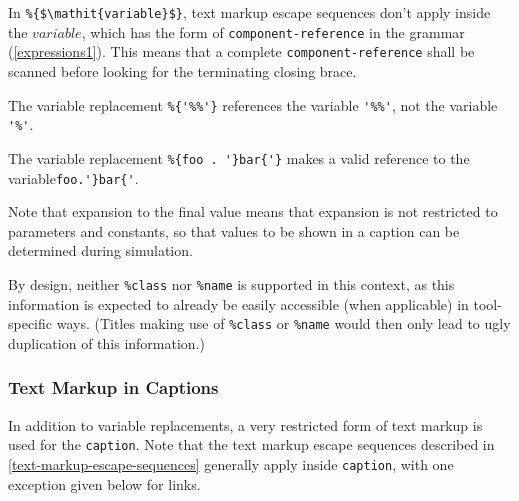 In \lstinline!%{$\mathit{variable}$}!, text markup escape sequences don't apply inside the $\mathit{variable}$, which has the form of \lstinline[language=grammar]!component-reference! in the grammar (\cref{expressions1}).  This means that a complete \lstinline[language=grammar]!component-reference! shall be scanned before looking for the terminating closing brace.

\begin{example}
The variable replacement \lstinline!%{'%%'}! references the variable \lstinline!'%%'!, not the variable \lstinline!'%'!.
\end{example}

\begin{example}
The variable replacement \lstinline!%{foo . '}bar{'}! makes a valid reference to the variable\linebreak[4] \lstinline!foo.'}bar{'!.
\end{example}

Note that expansion to the final value means that expansion is not restricted to
parameters and constants, so that values to be shown in a caption can be
determined during simulation.

\begin{nonnormative}
By design, neither \lstinline!%class! nor \lstinline!%name! is supported in this context, as this information is expected to already be easily accessible (when applicable) in tool-specific ways.  (Titles making use of \lstinline!%class! or \lstinline!%name! would then only lead to ugly duplication of this information.)
\end{nonnormative}

\subsubsection{Text Markup in Captions}\label{text-markup-in-captions}

In addition to variable replacements, a very restricted form of text markup is used for the \lstinline!caption!.  Note that the text markup escape sequences described in \cref{text-markup-escape-sequences} generally apply inside \lstinline!caption!, with one exception given below for links.

